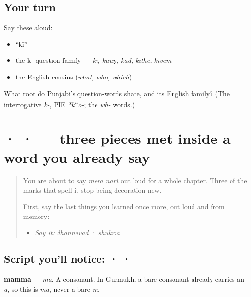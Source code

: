 \subsection*{Your turn}
Say these aloud:

\begin{itemize}
\raggedright
  \item \textquotedblleft{}kī\textquotedblright{}
  \item the k- question family — \emph{kī, kauṇ, kad, kithē, kivēṁ}
  \item the English cousins (\emph{what, who, which})
\end{itemize}

\begin{tcolorbox}[breakable,colback=teal!4,colframe=teal!35!black,title={Before you move on}]
What root do Punjabi's question-words share, and its English family? (The interrogative \emph{k-}, PIE \emph{*k\textsuperscript{w}o-}; the \emph{wh-} words.)
\end{tcolorbox}
\section[\texorpdfstring{\pa{ਮ} · \pa{ਰ} · \pa{ੇ} (ma · ra · -e)}{ਮ · ਰ · ੇ (ma · ra · -e)}]{ ·  ·  — three pieces met inside a word you already say}

\label{lesson:PA-S02-mamma-rara-lava}



\begin{quote}
You are about to say \emph{merā nāṁ} out loud for a whole chapter. Three of the marks that spell it stop being decoration now.

First, say the last things you learned once more, out loud and from memory:

\begin{itemize}
\raggedright
  \item \emph{Say it:} \emph{dhannavād} · \emph{shukrīā}
\end{itemize}
\end{quote}

\subsection*{Script you'll notice:  ·  · }
\begin{quote}
\end{quote}

\textbf{mammā} — \emph{ma}. A consonant. In Gurmukhi a bare consonant already carries an \emph{a}, so this is \emph{ma}, never a bare \emph{m}.

